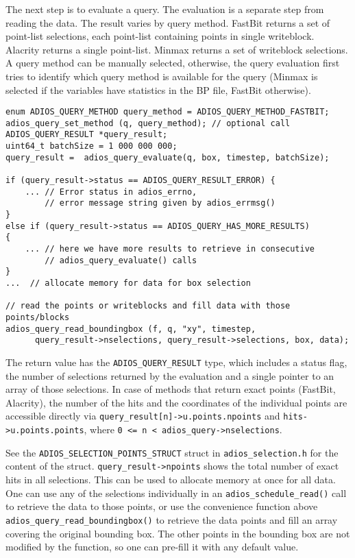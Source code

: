 \noindent The next step is to evaluate a query. The evaluation is a separate step from reading the data. The result varies by query method. FastBit returns a set of point-list selections, each point-list containing points in single writeblock. Alacrity returns a single point-list. Minmax returns a set of writeblock selections.  A query method can be manually selected, otherwise, the query evaluation first tries to identify which query method is available for the query (Minmax is selected if the variables have statistics in the BP file, FastBit otherwise). 

\begin{lstlisting}[alsolanguage=C]
enum ADIOS_QUERY_METHOD query_method = ADIOS_QUERY_METHOD_FASTBIT;
adios_query_set_method (q, query_method); // optional call
ADIOS_QUERY_RESULT *query_result;
uint64_t batchSize = 1 000 000 000;
query_result =  adios_query_evaluate(q, box, timestep, batchSize);

if (query_result->status == ADIOS_QUERY_RESULT_ERROR) {
    ... // Error status in adios_errno, 
        // error message string given by adios_errmsg()
}
else if (query_result->status == ADIOS_QUERY_HAS_MORE_RESULTS)
{
    ... // here we have more results to retrieve in consecutive 
        // adios_query_evaluate() calls
}
...  // allocate memory for data for box selection

// read the points or writeblocks and fill data with those points/blocks
adios_query_read_boundingbox (f, q, "xy", timestep,
      query_result->nselections, query_result->selections, box, data);

\end{lstlisting}

The return value has the \verb+ADIOS_QUERY_RESULT+ type, which includes a status flag, the number of selections returned by the evaluation and a single pointer to an array of those selections. In case of methods that return exact points (FastBit, Alacrity), the number of the hits and the coordinates of the individual points are accessible directly via 
 \verb+query_result[n]->u.points.npoints+ and 
 \verb+hits->u.points.points+, where 
 \verb+0 <= n < adios_query->nselections+.

See the \verb+ADIOS_SELECTION_POINTS_STRUCT+ struct in \verb+adios_selection.h+ for the content of the struct. 
\linebreak \verb+query_result->npoints+ shows the total number of exact hits in all selections. This can be used to allocate memory at once for all data. 
One can use any of the selections individually in an \verb+adios_schedule_read()+ call to retrieve the data to those points, or use the convenience function above \verb+adios_query_read_boundingbox()+ to retrieve the data points and fill an array covering the original bounding box. The other points in the bounding box are not modified by the function, so one can pre-fill it with any default value. 

